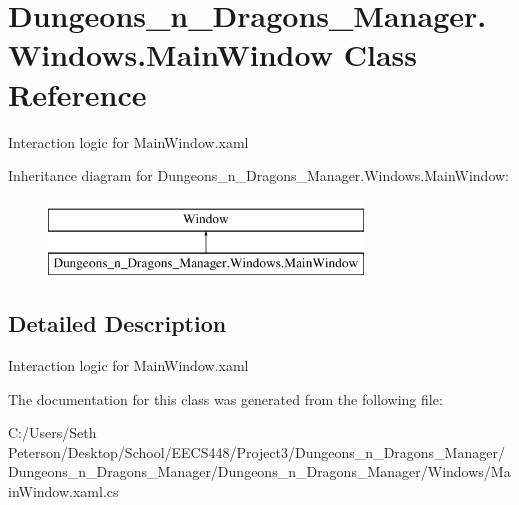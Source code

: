 \hypertarget{class_dungeons__n___dragons___manager_1_1_windows_1_1_main_window}{}\section{Dungeons\+\_\+n\+\_\+\+Dragons\+\_\+\+Manager.\+Windows.\+Main\+Window Class Reference}
\label{class_dungeons__n___dragons___manager_1_1_windows_1_1_main_window}


Interaction logic for Main\+Window.\+xaml  


Inheritance diagram for Dungeons\+\_\+n\+\_\+\+Dragons\+\_\+\+Manager.\+Windows.\+Main\+Window\+:\begin{figure}[H]
\begin{center}
\leavevmode
\includegraphics[height=2.000000cm]{class_dungeons__n___dragons___manager_1_1_windows_1_1_main_window}
\end{center}
\end{figure}


\subsection{Detailed Description}
Interaction logic for Main\+Window.\+xaml 



The documentation for this class was generated from the following file\+:\begin{DoxyCompactItemize}
\item 
C\+:/\+Users/\+Seth Peterson/\+Desktop/\+School/\+E\+E\+C\+S448/\+Project3/\+Dungeons\+\_\+n\+\_\+\+Dragons\+\_\+\+Manager/\+Dungeons\+\_\+n\+\_\+\+Dragons\+\_\+\+Manager/\+Dungeons\+\_\+n\+\_\+\+Dragons\+\_\+\+Manager/\+Windows/Main\+Window.\+xaml.\+cs\end{DoxyCompactItemize}
